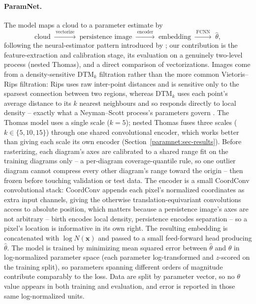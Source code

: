 \documentclass[11pt,a4paper]{article}
\theoremstyle{definitioncolon}
\begin{document}
\paragraph{ParamNet.}
The model maps a cloud to a parameter estimate by
\begin{equation}
\label{paramnet:eq-pipeline}
\text{cloud} \;\xrightarrow{\;\text{vectorize}\;}\;
\text{persistence image} \;\xrightarrow{\;\text{encoder}\;}\;
\text{embedding} \;\xrightarrow{\;\text{FCNN}\;}\;
\hat\theta,
\end{equation}
following the neural-estimator pattern introduced by
\citet{vihrs2022neural}; our contribution is the feature-extraction and
calibration stage, its evaluation on a genuinely two-level process (nested
Thomas), and a direct comparison of vectorizations. Images come from a
density-sensitive DTM$_k$ filtration rather than the more common
Vietoris--Rips filtration: Rips uses raw inter-point distances and is
sensitive only to the sparsest connection between two regions, whereas
DTM$_k$ uses each point's average distance to its $k$ nearest neighbours
and so responds directly to local density -- exactly what a Neyman--Scott
process's parameters govern \citep{anai2020dtm}. The Thomas model uses a
single scale ($k=5$); nested Thomas fuses three scales ($k\in\{5,10,15\}$)
through one shared convolutional encoder, which works better than giving
each scale its own encoder (Section~\ref{paramnet:sec-results}). Before
rasterizing, each diagram's axes are calibrated to a shared range fit on
the training diagrams only -- a per-diagram coverage-quantile rule, so one
outlier diagram cannot compress every other diagram's range toward the
origin -- then frozen before touching validation or test data. The encoder
is a small CoordConv
\citep{liu2018coordconv} convolutional stack: CoordConv appends each
pixel's normalized coordinates as extra input channels, giving the
otherwise translation-equivariant convolutions access to absolute position,
which matters because a persistence image's axes are not arbitrary --
birth encodes local density, persistence encodes separation -- so a
pixel's location is informative in its own right. The resulting embedding
is concatenated with $\log N(\mathbf{x})$ and passed to a small
feed-forward head producing $\hat\theta$. The model is trained by
minimizing mean squared error between $\hat\theta$ and $\theta$ in
log-normalized parameter space (each parameter log-transformed and
$z$-scored on the training split), so parameters spanning different orders
of magnitude contribute comparably to the loss. Data are split by
parameter vector, so no $\theta$ value appears in both training and
evaluation, and error is reported in those same log-normalized units.
\end{document}

